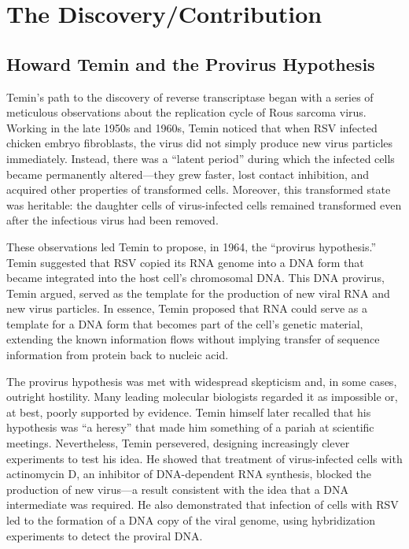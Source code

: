 \section{The Discovery/Contribution}

\subsection{Howard Temin and the Provirus Hypothesis}

Temin's path to the discovery of reverse transcriptase began with a series of meticulous observations about the replication cycle of Rous sarcoma virus. Working in the late 1950s and 1960s, Temin noticed that when RSV infected chicken embryo fibroblasts, the virus did not simply produce new virus particles immediately. Instead, there was a ``latent period'' during which the infected cells became permanently altered---they grew faster, lost contact inhibition, and acquired other properties of transformed cells. Moreover, this transformed state was heritable: the daughter cells of virus-infected cells remained transformed even after the infectious virus had been removed.

These observations led Temin to propose, in 1964, the ``provirus hypothesis.'' Temin suggested that RSV copied its RNA genome into a DNA form that became integrated into the host cell's chromosomal DNA. This DNA provirus, Temin argued, served as the template for the production of new viral RNA and new virus particles. In essence, Temin proposed that RNA could serve as a template for a DNA form that becomes part of the cell's genetic material, extending the known information flows without implying transfer of sequence information from protein back to nucleic acid.

The provirus hypothesis was met with widespread skepticism and, in some cases, outright hostility. Many leading molecular biologists regarded it as impossible or, at best, poorly supported by evidence. Temin himself later recalled that his hypothesis was ``a heresy'' that made him something of a pariah at scientific meetings. Nevertheless, Temin persevered, designing increasingly clever experiments to test his idea. He showed that treatment of virus-infected cells with actinomycin D, an inhibitor of DNA-dependent RNA synthesis, blocked the production of new virus---a result consistent with the idea that a DNA intermediate was required. He also demonstrated that infection of cells with RSV led to the formation of a DNA copy of the viral genome, using hybridization experiments to detect the proviral DNA.

